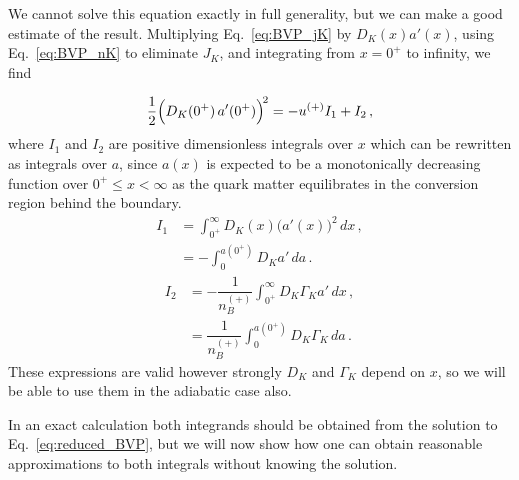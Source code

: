 \documentclass[10pt,superscriptaddress,
amsmath,aps,prc,twocolumn,nofootinbib,floatfix]{revtex4-1}
\newcommand{\mga}[1]{{\color[rgb]{0.6,0,0}#1}}
\newcommand{\Ga}{\Gamma}
\newcommand{\dsp}{\displaystyle}
\newcommand{\hide}[1]{}
\begin{document}
We cannot solve this equation exactly in full generality, but we can make a good estimate of the result. 
Multiplying Eq.~\eqref{eq:BVP_jK} by $D_K(x)a'(x)$, using Eq.~\eqref{eq:BVP_nK} to eliminate $J_K$, and integrating from $x=0^+$ to infinity, we find
\hide{
\begin{equation}
\begin{array}{rl}
 \dfrac{1}{2} \Bigl( D_K(0^+)\,n_K'(0^+)\Bigr)^{\!2}
 = &-\,u^{(+)}\!\!\dsp\int_{0^+}^\infty \!\!\!  D_K(x)\,\bigl(n_K'(x)\bigr)^2 \, dx\\[2ex] 
  -&\dsp\int_{0^+}^\infty \!\!\! D_K(x)\,n_K'(x) \Gamma_K(x) \, dx
\end{array}
\end{equation}
}
\begin{equation}
 \dfrac{1}{2} \Bigl( D_K(0^+)\,a'(0^+)\Bigr)^{\!2} = -u^{(+)}I_1 + I_2 \,,
 \label{eq:integrals}
\end{equation}
where $I_1$ and $I_2$ are positive dimensionless integrals over $x$ which can be rewritten as integrals over $a$, since $a(x)$ is expected to be a monotonically decreasing function over $0^+\leqslant x < \infty$ as the quark matter equilibrates in the conversion region behind the boundary.
\begin{equation}
\begin{array}{rl}
I_1 &= \dsp \int_{0^+}^\infty D_K(x) \bigl(a'(x)\bigr)^2\,dx \,, \\[2ex]
  &= -\dsp\int_0^{a(0^+)} D_K a'\,da \,.
  \end{array}
  \label{eq:I1_definition}
\end{equation}
%
\begin{equation}
\begin{array}{rl}
I_2 &=-\dfrac{1}{n_B^{(+)}}\dsp\int_{0^+}^\infty  D_K \Ga_K a'\,dx \,, \\[2ex]
&= \dfrac{1}{n_B^{(+)}}\dsp\int_0^{a(0^+)} D_K \Ga_K\,da \,.
 \end{array}
\label{eq:I2_definition}
\end{equation}
\mga{These expressions are valid however strongly $D_K$ and $\Ga_K$ depend on $x$, so we will be able to use them in the adiabatic case also.}

In an exact calculation both integrands should be obtained from the solution to Eq.~\eqref{eq:reduced_BVP}, but we will now show how one can obtain reasonable approximations to both integrals without knowing the solution.
\end{document}
